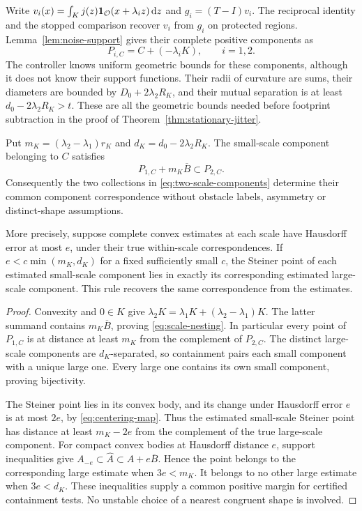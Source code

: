 Write $v_i(x)=\int_Kj(z)\mathbf 1_{\mathcal O}(x+\lambda_i z)\,\mathrm d z$
and $g_i=(T-I)v_i$. The reciprocal identity and the stopped comparison
recover $v_i$ from $g_i$ on protected regions. Lemma~\ref{lem:noise-support}
gives their complete positive components as
\begin{equation}\label{eq:two-scale-components}
                 P_{i,C}=C+(-\lambda_iK),\qquad i=1,2.
\end{equation}
The controller knows uniform geometric bounds for these components,
although it does not know their support functions. Their radii of
curvature are sums, their diameters are bounded by $D_0+2\lambda_2R_K$,
and their mutual separation is at least $d_0-2\lambda_2R_K>t$.
These are all the geometric bounds needed before footprint subtraction
in the proof of Theorem~\ref{thm:stationary-jitter}.

\begin{lemma}
\label{lem:scale-matching}
Put $m_K=(\lambda_2-\lambda_1)r_K$ and
$d_K=d_0-2\lambda_2R_K$. The small-scale component belonging to
$C$ satisfies
\begin{equation}\label{eq:scale-nesting}
                 P_{1,C}+m_K\overline B\subset P_{2,C}.
\end{equation}
Consequently the two collections in \eqref{eq:two-scale-components}
determine their common component correspondence without obstacle labels,
asymmetry or distinct-shape assumptions.

More precisely, suppose complete convex estimates at each scale have
Hausdorff error at most $e$, under their true within-scale correspondences.
If $e<c\min(m_K,d_K)$ for a fixed sufficiently small $c$, the Steiner
point of each estimated small-scale component lies in exactly its
corresponding estimated large-scale component. This rule recovers the
same correspondence from the estimates.
\end{lemma}
\begin{proof}
Convexity and $0\in K$ give
$\lambda_2K=\lambda_1K+(\lambda_2-\lambda_1)K$.
The latter summand contains $m_K\overline B$, proving
\eqref{eq:scale-nesting}. In particular every point of $P_{1,C}$
is at distance at least $m_K$ from the complement of $P_{2,C}$.
The distinct large-scale components are $d_K$-separated, so containment
pairs each small component with a unique large one. Every large one
contains its own small component, proving bijectivity.

The Steiner point lies in its convex body, and its change under
Hausdorff error $e$ is at most $2e$, by \eqref{eq:centering-map}.
Thus the estimated small-scale Steiner point has distance at least
$m_K-2e$ from the complement of the true large-scale component.
For compact convex bodies at Hausdorff distance $e$, support inequalities
give $A_{-e}\subset\widehat A\subset A+e\overline B$. Hence the
point belongs to the corresponding large estimate when $3e<m_K$.
It belongs to no other large estimate when $3e<d_K$. These inequalities
supply a common positive margin for certified containment tests.
No unstable choice of a nearest congruent shape is involved.
\end{proof}

